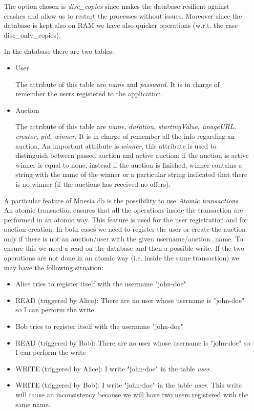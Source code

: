 \noindent The option chosen is \textit{disc\_copies} since makes the database resilient against crashes and allow us to restart the processes without issues. Moreover since the database is kept also on RAM we have also quicker operations (w.r.t. the case disc\_only\_copies). 

\vspace{0.5cm}

\noindent In the database there are two tables:
\begin{itemize}
	\item User
	
	\noindent The attribute of this table are \textit{name} and \textit{password}. It is in charge of remember the users registered to the application.
	
	\item Auction
	
	\noindent The attribute of this table are \textit{name, duration, startingValue, imageURL, creator, pid, winner}.
	It is in charge of remember all the info regarding an auction. An important attribute is \textit{winner}, this attribute is used to distinguish between passed auction and active auction: if the auction is active winner is equal to none, instead if the auction is finished, winner contains a string with the name of the winner or a particular string indicated that there is no winner (if the auctions has received no offers).
\end{itemize}

\noindent A particular feature of Mnesia db is the possibility to use \textit{Atomic transactions}. An atomic transaction ensures that all the operations inside the transaction are performed in an atomic way. This feature is used for the user registration and for auction creation. In both cases we need to register the user or create the auction only if there is not an auction/user with the given username/auction\_name. To ensure this we need a read on the database and then a possible write. If the two operations are not done in an atomic way (i.e. inside the same transaction) we may have the following situation:

\begin{itemize}
	\item Alice tries to register itself with the username "john-doe"
	\item READ (triggered by Alice): There are no user whose username is "john-doe" so I can perform the write
	\item Bob tries to register itself with the username "john-doe"
	\item READ (triggered by Bob): There are no user whose username is "john-doe" so I can perform the write
	\item WRITE (triggered by Alice): I write "john-doe" in the table \textit{user}.
	\item WRITE (triggered by Bob): I write "john-doe" in the table \textit{user}. This write will cause an inconsistency because we will have two users registered with the same name.	
\end{itemize} 

